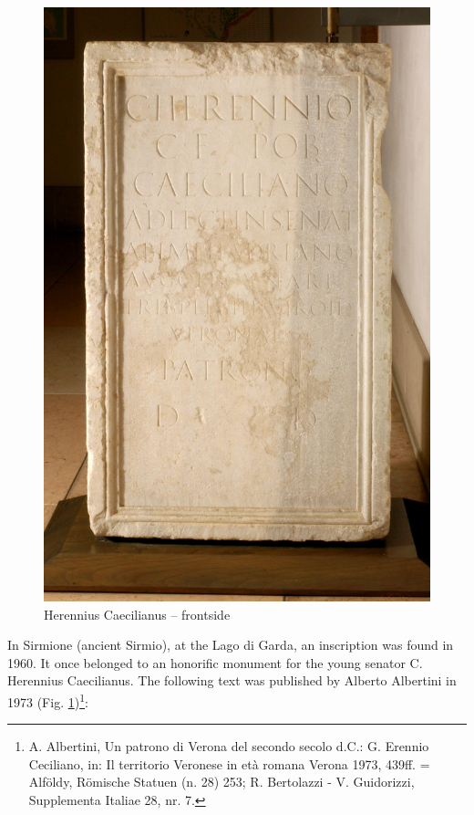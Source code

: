 \documentclass[amsthm,ebook]{saparticle}
\begin{document}
\begin{figure}[!bp]
\centering
 \includegraphics[scale=0.6]{images/fig04}
\caption{Herennius Caecilianus -- frontside}
\label{fig:4}
\end{figure}

In Sirmione (ancient Sirmio), at the Lago di Garda, an inscription was found in 
1960. It once belonged to an honorific monument for the young senator C. Herennius 
Caecilianus. The following text was published by Alberto Albertini in 1973 (Fig. \ref{fig:4})\footnote{\label{fn:46}A. Albertini, Un patrono di Verona del secondo secolo d.C.: G. Erennio Ceciliano, in: Il territorio Veronese in età romana Verona 1973, 439ff. = Alföldy, Römische Statuen (n. 28) 253; R. Bertolazzi - V. Guidorizzi, Supplementa Italiae 28, nr. 7.}:
\end{document}
